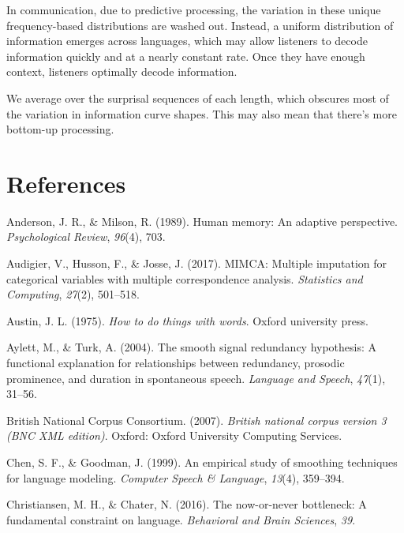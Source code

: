 \documentclass[10pt, letterpaper]{article}
\begin{document}
In communication, due to predictive processing, the variation in these
unique frequency-based distributions are washed out. Instead, a uniform
distribution of information emerges across languages, which may allow
listeners to decode information quickly and at a nearly constant rate.
Once they have enough context, listeners optimally decode information.

We average over the surprisal sequences of each length, which obscures
most of the variation in information curve shapes. This may also mean
that there's more bottom-up processing.

\hypertarget{references}{%
\section{References}\label{references}}

\setlength{\parindent}{-0.1in} 
\setlength{\leftskip}{0.125in}

\noindent

\hypertarget{refs}{}
\leavevmode\hypertarget{ref-anderson1989}{}%
Anderson, J. R., \& Milson, R. (1989). Human memory: An adaptive
perspective. \emph{Psychological Review}, \emph{96}(4), 703.

\leavevmode\hypertarget{ref-audigier2017}{}%
Audigier, V., Husson, F., \& Josse, J. (2017). MIMCA: Multiple
imputation for categorical variables with multiple correspondence
analysis. \emph{Statistics and Computing}, \emph{27}(2), 501--518.

\leavevmode\hypertarget{ref-austin1975}{}%
Austin, J. L. (1975). \emph{How to do things with words}. Oxford
university press.

\leavevmode\hypertarget{ref-aylett2004}{}%
Aylett, M., \& Turk, A. (2004). The smooth signal redundancy hypothesis:
A functional explanation for relationships between redundancy, prosodic
prominence, and duration in spontaneous speech. \emph{Language and
Speech}, \emph{47}(1), 31--56.

\leavevmode\hypertarget{ref-british-national-corpus-consortium2007}{}%
British National Corpus Consortium. (2007). \emph{British national
corpus version 3 (BNC XML edition)}. Oxford: Oxford University Computing
Services.

\leavevmode\hypertarget{ref-chen1999}{}%
Chen, S. F., \& Goodman, J. (1999). An empirical study of smoothing
techniques for language modeling. \emph{Computer Speech \& Language},
\emph{13}(4), 359--394.

\leavevmode\hypertarget{ref-christiansen2016}{}%
Christiansen, M. H., \& Chater, N. (2016). The now-or-never bottleneck:
A fundamental constraint on language. \emph{Behavioral and Brain
Sciences}, \emph{39}.
\end{document}
